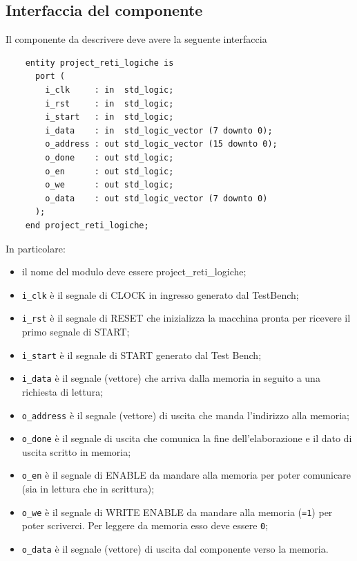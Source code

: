 \documentclass{article}
\begin{document}
\subsection{Interfaccia del componente} %
Il componente da descrivere deve avere la seguente interfaccia

\begin{verbatim}
    entity project_reti_logiche is
	  port (
	    i_clk     : in  std_logic;
	    i_rst     : in  std_logic; 
	    i_start   : in  std_logic; 
	    i_data    : in  std_logic_vector (7 downto 0);
	    o_address : out std_logic_vector (15 downto 0);
    	o_done    : out std_logic; 
    	o_en      : out std_logic;
	    o_we      : out std_logic;
	    o_data    : out std_logic_vector (7 downto 0) 
	  );
    end project_reti_logiche;
\end{verbatim}
\vspace{0,2cm} %

In particolare:
\begin{itemize}
    \item   il nome del modulo deve essere project\_reti\_logiche;
    \item   \texttt{i\_clk} è il segnale di CLOCK in ingresso generato dal TestBench;
    \item   \texttt{i\_rst} è il segnale di RESET che inizializza la macchina pronta per ricevere il primo segnale di START;
    \item   \texttt{i\_start} è il segnale di START generato dal Test Bench;
    \item   \texttt{i\_data} è il segnale (vettore) che arriva dalla memoria in seguito a una richiesta di lettura;
    \item   \texttt{o\_address} è il segnale (vettore) di uscita che manda l’indirizzo alla memoria;
    \item   \texttt{o\_done} è il segnale di uscita che comunica la fine dell’elaborazione e il dato di uscita scritto in memoria;
    \item   \texttt{o\_en} è il segnale di ENABLE da mandare alla memoria per poter comunicare (sia in lettura che in scrittura);
    \item   \texttt{o\_we} è il segnale di WRITE ENABLE da mandare alla memoria (\texttt{=1}) per poter scriverci. Per leggere da memoria esso deve essere \texttt{0};
    \item   \texttt{o\_data} è il segnale (vettore) di uscita dal componente verso la memoria.
\end{itemize}
\end{document}
